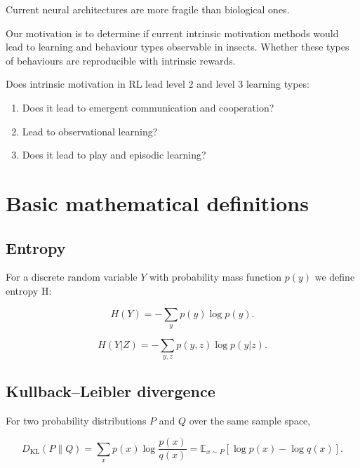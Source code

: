 Current neural architectures are more fragile than biological ones.

Our motivation is to determine if current intrinsic motivation methods would lead to learning and behaviour types observable in insects. Whether these types of behaviours are reproducible with intrinsic rewards.

Does intrinsic motivation in RL lead level 2 and level 3 learning types:

\begin{enumerate}
\def\labelenumi{\arabic{enumi})}
\item
  Does it lead to emergent communication and cooperation?
\item
  Lead to observational learning?
\item
  Does it lead to play and episodic learning?
\end{enumerate}


\pagebreak
\section{Basic mathematical definitions}\label{basic-math-definitions}


\subsection*{Entropy}

For a discrete random variable $Y$ with probability mass function $p(y)$ we define entropy H:

\begin{equation}
	H(Y)=-\sum_y p(y)\log p(y).
\end{equation}

\begin{equation}
	H(Y|Z) =	-\sum_{y,z}p(y,z)\log p(y|z).
\end{equation}


\subsection*{Kullback--Leibler divergence}

For two probability distributions $P$ and $Q$ over the same sample space,

\begin{equation}
	D_{\mathrm{KL}}(P\|Q)
	=
	\sum_x p(x)\log\frac{p(x)}{q(x)}
	=
	\mathbb{E}_{x\sim P}
	\left[
	\log p(x)-\log q(x)
	\right].
\end{equation}



